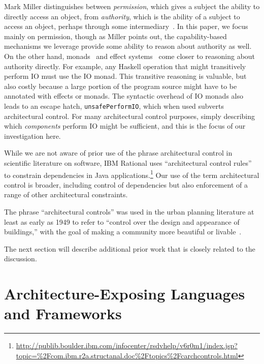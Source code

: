 \documentclass[runningheads]{llncs}
\begin{document}
\begin{sloppypar}
Mark Miller distinguishes between \textit{permission}, which gives a subject the ability to directly access an object, from \textit{authority}, which is the ability of a subject to access an object, perhaps through some intermediary~\cite{MarkMiller-E}.  In this paper, we focus mainly on permission, though as Miller points out, the capability-based mechanisms we leverage provide some ability to reason about authority as well.  On the other hand, monads~\cite{Wadler:1992:EFP:143165.143169} and effect systems~\cite{FX} come closer to reasoning about authority directly.  For example, any Haskell operation that might transitively perform IO must use the IO monad.  This transitive reasoning is valuable, but also costly because a large portion of the program source might have to be annotated with effects or monads.  The syntactic overhead of IO monads also leads to an escape hatch, \texttt{unsafePerformIO}, which when used subverts architectural control.  For many architectural control purposes, simply describing which \textit{components} perform IO might be sufficient, and this is the focus of our investigation here.


While we are not aware of prior use of the phrase architectural control
in scientific literature on software, IBM Rational uses ``architectural control rules''
to constrain dependencies in Java applications.\footnote{\url{http://publib.boulder.ibm.com/infocenter/rsdvhelp/v6r0m1/index.jsp?topic=\%2Fcom.ibm.r2a.structanal.doc\%2Ftopics\%2Fcarchcontrols.html}}
Our use of the term architectural control is broader, including control of dependencies but also enforcement of a range of other architectural constraints.

The phrase ``architectural controls'' was used in the urban planning
literature at least as early as 1949 to refer to ``control over the
design and appearance of buildings,'' with the goal of making a
community more beautiful or livable~\cite{arch-controls}.

The next section will describe additional prior work that is closely related to the discussion.

\section{Architecture-Exposing Languages and Frameworks}


\end{sloppypar}
\end{document}
